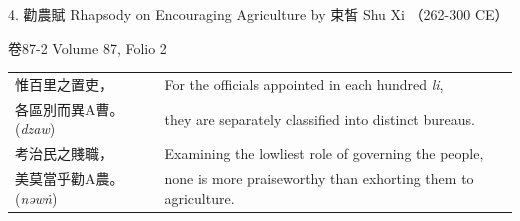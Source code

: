 4. 勸農賦 Rhapsody on Encouraging Agriculture by 束皙 Shu Xi
（262-300 CE）

卷87-2
Volume 87, Folio 2


\begin{longtable}{p{} p{}}


惟百里之置吏， &
For the officials appointed in each hundred \emph{li},\\

各區別而異A曹。(\textit{dzaw})
&
they are separately classified into distinct bureaus.\\

考治民之賤職， &
Examining the lowliest role of governing the people,\\

美莫當乎勸A農。(\textit{nəwṅ})
&
none is more praiseworthy than exhorting them to agriculture.\\












\end{longtable}
